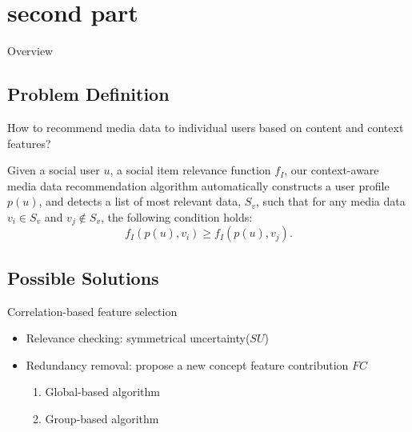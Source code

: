 \section{second part}
\begin{frame}[noframenumbering]{Overview}
\end{frame}

\subsection{Problem Definition}
\begin{frame}{\insertsection}
	How to recommend media data to individual users based on content and context features?
	\begin{defi}
		Given a social user $u$, a social item relevance function $f_I$, our context-aware media data recommendation algorithm automatically constructs a user profile $p(u)$, and detects a list of most relevant data, $S_v$, such that for any media data $v_i\in S_v$   and $v_j\notin S_v$, the following condition holds:
		\begin{equation}
			f_I(p(u),v_i)\geq f_I(p(u),v_j).
		\end{equation}
	\end{defi}
\end{frame}

\subsection{Possible Solutions}
\begin{frame}{\insertsection}
	\begin{solu}
		Correlation-based feature selection
	\end{solu}
	\vspace{0.4cm}
	\begin{itemize}
		\item Relevance checking: symmetrical uncertainty($SU$)
		\setcounter{solu}{0}
		\item Redundancy removal: propose a new concept feature contribution $FC$
		\vspace{1em}
		\begin{enumerate}
			\setlength\itemsep{1em}
			\item Global-based algorithm
			\item Group-based algorithm
		\end{enumerate}
	\end{itemize}
\end{frame}

